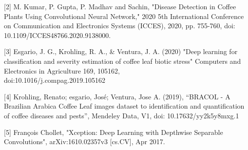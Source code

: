 \documentclass[a4paper,14pt]{extarticle}
\begin{document}
[2] M. Kumar, P. Gupta, P. Madhav and Sachin, "Disease Detection in Coffee Plants Using Convolutional Neural Network," 2020 5th International Conference on Communication and Electronics Systems (ICCES), 2020, pp. 755-760, doi: 10.1109/ICCES48766.2020.9138000.

[3] Esgario, J. G., Krohling, R. A., \& Ventura, J. A. (2020) "Deep learning for classification and severity estimation of coffee leaf biotic stress" Computers and Electronics in Agriculture 169, 105162,\\doi:10.1016/j.compag.2019.105162

[4] Krohling, Renato; esgario, José; Ventura, Jose A. (2019), “BRACOL - A Brazilian Arabica Coffee Leaf images dataset to identification and quantification of coffee diseases and pests”, Mendeley Data, V1, doi: 10.17632/yy2k5y8mxg.1

[5] François Chollet, "Xception: Deep Learning with Depthwise Separable Convolutions", arXiv:1610.02357v3 [cs.CV], Apr 2017.
\end{document}
